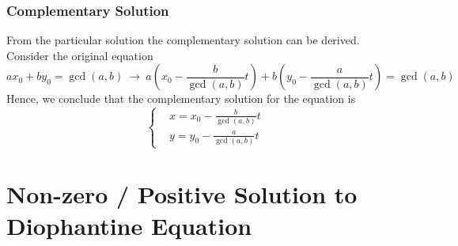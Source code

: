 \documentclass[11pt]{article}
\begin{document}
\subsubsection{Complementary Solution}
From the particular solution the complementary solution can be derived. Consider the original equation
\begin{equation}
    ax_0 + by_0 = \gcd(a, b)~\rightarrow~a\left(x_0 - \frac{b}{\gcd(a,b)}t\right) + b\left(y_0 - \frac{a}{\gcd(a,b)}t\right) = \gcd(a,b)
\end{equation}
Hence, we conclude that the complementary solution for the equation is
\begin{equation}
    \left \{ \begin{aligned} &x = x_0 - \frac{b}{\gcd(a,b)}t \\ &y = y_0 - \frac{a}{\gcd(a,b)}t \end{aligned} \right. 
\end{equation}
\section{Non-zero / Positive Solution to Diophantine Equation}
\end{document}
